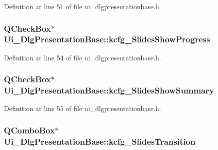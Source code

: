 Definition at line 51 of file ui\+\_\+dlgpresentationbase.\+h.

\hypertarget{classUi__DlgPresentationBase_a49775134ab9e76d0159e100bbe9f7cc3}{
\subsubsection[{kcfg\+\_\+\+Slides\+Show\+Progress}]{\setlength{\rightskip}{0pt plus 5cm}Q\+Check\+Box$\ast$ Ui\+\_\+\+Dlg\+Presentation\+Base\+::kcfg\+\_\+\+Slides\+Show\+Progress}}\label{classUi__DlgPresentationBase_a49775134ab9e76d0159e100bbe9f7cc3}


Definition at line 54 of file ui\+\_\+dlgpresentationbase.\+h.

\hypertarget{classUi__DlgPresentationBase_aaa52dec18529c711c073a72fa10ac18e}{
\subsubsection[{kcfg\+\_\+\+Slides\+Show\+Summary}]{\setlength{\rightskip}{0pt plus 5cm}Q\+Check\+Box$\ast$ Ui\+\_\+\+Dlg\+Presentation\+Base\+::kcfg\+\_\+\+Slides\+Show\+Summary}}\label{classUi__DlgPresentationBase_aaa52dec18529c711c073a72fa10ac18e}


Definition at line 55 of file ui\+\_\+dlgpresentationbase.\+h.

\hypertarget{classUi__DlgPresentationBase_a125d8ff275f99a6c635d6ed80a7863eb}{
\subsubsection[{kcfg\+\_\+\+Slides\+Transition}]{\setlength{\rightskip}{0pt plus 5cm}Q\+Combo\+Box$\ast$ Ui\+\_\+\+Dlg\+Presentation\+Base\+::kcfg\+\_\+\+Slides\+Transition}}\label{classUi__DlgPresentationBase_a125d8ff275f99a6c635d6ed80a7863eb}


